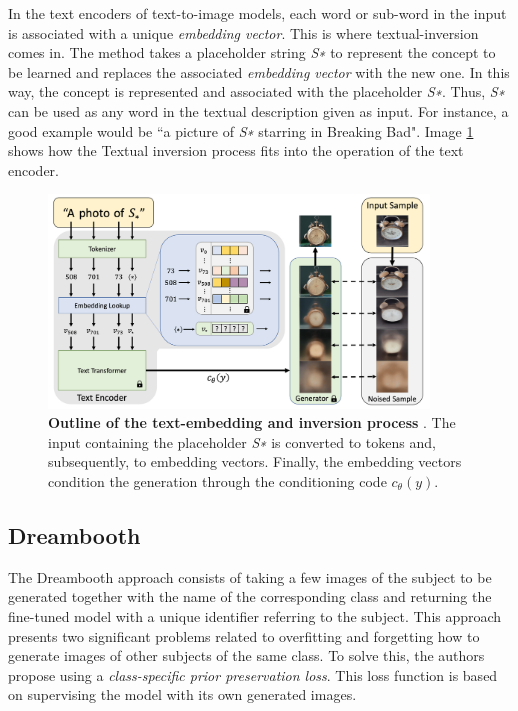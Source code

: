 In the text encoders of text-to-image models, each word or sub-word in the input is associated with a unique \textit{embedding vector}. This is where textual-inversion comes in. The method takes a placeholder string \textit{S∗} to represent the concept to be learned and replaces the associated \textit{embedding vector} with the new one. In this way, the concept is represented and associated with the placeholder \textit{S∗}. Thus, \textit{S∗} can be used as any word in the textual description given as input. For instance, a good example would be ``a picture of \textit{S∗} starring in Breaking Bad". Image \ref{fig:textualI} shows how the Textual inversion process fits into the operation of the text encoder.

\begin{figure}
    \centering
    \includegraphics[width=0.9\textwidth]{Pictures/textualI.png} 
    \caption{\textbf{Outline of the text-embedding and inversion process} \cite{gal2022image}. The input containing the placeholder \textit{S∗} is converted to tokens and, subsequently, to embedding vectors. Finally, the embedding vectors condition the generation through the conditioning code $c_{\theta }(y)$.}
    \label{fig:textualI}
\end{figure}

\subsection{Dreambooth}

The Dreambooth approach consists of taking a few images of the subject to be generated together with the name of the corresponding class and returning the fine-tuned model with a unique identifier referring to the subject. This approach presents two significant problems related to overfitting and forgetting how to generate images of other subjects of the same class. To solve this, the authors propose using a \textit{class-specific prior preservation loss}. This loss function is based on supervising the model with its own generated images.


